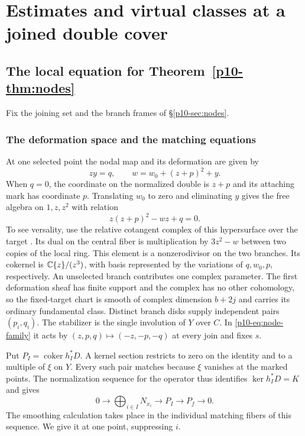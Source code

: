 \section{Estimates and virtual classes at a joined double cover}\label{app:lowerjoins}
\subsection{The local equation for Theorem~\ref{p10-thm:nodes}}\label{app:double-equation}
Fix the joining set and the branch frames of \S\ref{p10-sec:nodes}.
\subsubsection{The deformation space and the matching equations}

At one selected point the nodal map and its deformation are given by
\begin{equation}\label{p10-eq:node-family}
          zy=q,\qquad w=w_0+(z+p)^2+y .
\end{equation}
When $q=0$, the coordinate on the normalized double is $z+p$ and
its attaching mark has coordinate $p$. Translating $w_0$ to zero and
eliminating $y$ gives the free algebra on $1,z,z^2$ with relation
\begin{equation}\label{p10-eq:node-cubic}
                    z(z+p)^2-wz+q=0 .
\end{equation}
To see versality, use the relative cotangent complex of this
hypersurface over the target \cite[Tag~08SL]{stacks}. Its dual on the
central fiber is multiplication by $3z^2-w$ between two copies of
the local ring. This element is a nonzerodivisor on the two branches.
Its cokernel is $\mathbb C\{z\}/(z^3)$, with basis represented by the
variations of $q,w_0,p$, respectively. An unselected branch contributes
one complex parameter. The first deformation sheaf has finite support
and the complex has no other cohomology, so the fixed-target chart is
smooth of complex dimension $b+2j$ and carries its ordinary fundamental
class. Distinct branch disks supply independent pairs $(p_i,q_i)$.
The stabilizer is the single involution of $Y$ over $C$. In
\eqref{p10-eq:node-family} it acts by $(z,p,q)\mapsto(-z,-p,-q)$ at every
join and fixes $s$.

Put $P_I=\operatorname{coker} h_I^*D$. A kernel section restricts to
zero on the identity and to a multiple of $\xi$ on $Y$. Every such pair
matches because $\xi$ vanishes at the marked points. The normalization
sequence for the operator thus identifies $\ker h_I^*D=K$ and gives
\begin{equation}\label{p10-eq:node-matching}
       0\longrightarrow\bigoplus_{i\in I}N_{x_i}
       \longrightarrow P_I\longrightarrow P_f\longrightarrow0 .
\end{equation}
The smoothing calculation takes place in the individual matching fibers
of this sequence. We give it at one point, suppressing $i$.

